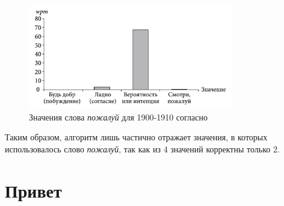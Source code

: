 \begin{figure}[H]
    \centering %
    \includegraphics[width=0.8\textwidth]{img/book/pozhaluj/1900-1910}
    \caption{Значения слова \textit{пожалуй} для 1900-1910 согласно~\cite{TwoCenturies}}
    \label{fig:TwoCentrutiesPozhaluj2}
\end{figure}

Таким образом, алгоритм лишь частично отражает значения, в которых использовалось
слово \textit{пожалуй}, так как из 4 значений корректны только 2.

\section*{Привет}

